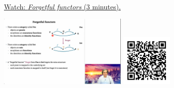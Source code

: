 
\begin{minipage}{10cm}
    \href{https://act4e-spring21.netlify.app/videos/spring2021-functors:semi-and-fun:forgetful-fun.html}{Watch: \emph{Forgetful functors} (3 minutes).}
        
    \href{https://act4e-spring21.netlify.app/videos/spring2021-functors:semi-and-fun:forgetful-fun.html}{\includegraphics[height=3.5cm]{spring2021-functors:semi-and-fun:forgetful-fun/thumbnails.jpg}}
    \href{https://act4e-spring21.netlify.app/videos/spring2021-functors:semi-and-fun:forgetful-fun.html}{\includegraphics[height=2.5cm]{spring2021-functors:semi-and-fun:forgetful-fun/qrcode.png}}
\end{minipage}
